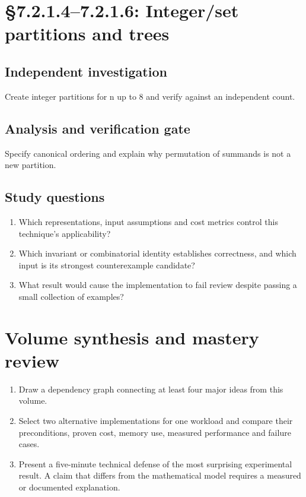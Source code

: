\documentclass[11pt,letterpaper]{article}
\begin{document}
\section{\S 7.2.1.4--7.2.1.6: Integer/set partitions and trees}
\subsection{Independent investigation}
Create integer partitions for n up to 8 and verify against an independent count.
\subsection{Analysis and verification gate}
Specify canonical ordering and explain why permutation of summands is not a new partition.
\subsection{Study questions}
\begin{enumerate}
\item Which representations, input assumptions and cost metrics control this technique's applicability?
\item Which invariant or combinatorial identity establishes correctness, and which input is its strongest counterexample candidate?
\item What result would cause the implementation to fail review despite passing a small collection of examples?
\end{enumerate}

\section{Volume synthesis and mastery review}
\begin{enumerate}
\item Draw a dependency graph connecting at least four major ideas from this volume.
\item Select two alternative implementations for one workload and compare their preconditions, proven cost, memory use, measured performance and failure cases.
\item Present a five-minute technical defense of the most surprising experimental result. A claim that differs from the mathematical model requires a measured or documented explanation.
\end{enumerate}
\end{document}
